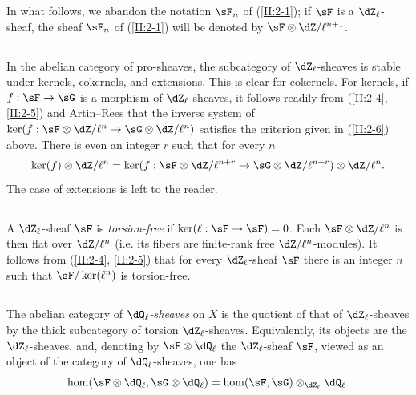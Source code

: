 In what follows, we abandon the notation $\sF_n$ of (\ref{II:2-1}); if
$\sF$ is a $\dZ_\ell$-sheaf, the sheaf $\sF_n$ of (\ref{II:2-1}) will be
denoted by $\sF\otimes\dZ/\ell^{n+1}$.






\subsection{}\label{II:2-7}

In the abelian category of pro-sheaves, the subcategory of
$\dZ_\ell$-sheaves is stable under kernels, cokernels, and extensions. This is
clear for cokernels. For kernels, if $f:\sF\to\sG$ is a morphism of
$\dZ_\ell$-sheaves, it follows readily from
(\ref{II:2-4}, \ref{II:2-5}) and Artin--Rees that the inverse system of
$\ker(f:\sF\otimes\dZ/\ell^n\to\sG\otimes\dZ/\ell^n)$ satisfies the
criterion given in (\ref{II:2-6}) above. There is even an integer $r$ such
that for every $n$
\[
  \ker(f)\otimes\dZ/\ell^n = \ker(f:\sF\otimes\dZ/\ell^{n+r}\to\sG\otimes\dZ/\ell^{n+r})\otimes\dZ/\ell^n \text{.}
\]
The case of extensions is left to the reader.






\subsection{}\label{II:2-8}

A $\dZ_\ell$-sheaf $\sF$ is \emph{torsion-free} if
$\ker(\ell:\sF\to\sF) = 0$. Each $\sF\otimes\dZ/\ell^n$ is then flat over
$\dZ/\ell^n$ (i.e. its fibers are finite-rank free
$\dZ/\ell^n$-modules). It follows from (\ref{II:2-4}, \ref{II:2-5}) that for
every $\dZ_\ell$-sheaf $\sF$ there is an integer $n$ such that
$\sF/\ker(\ell^n)$ is torsion-free.






\subsection{}\label{II:2-9}

The abelian category of \emph{$\dQ_\ell$-sheaves} on $X$ is the quotient of
that of $\dZ_\ell$-sheaves by the thick subcategory of torsion
$\dZ_\ell$-sheaves. Equivalently, its objects are the $\dZ_\ell$-sheaves,
and, denoting by $\sF\otimes\dQ_\ell$ the $\dZ_\ell$-sheaf $\sF$, viewed as
an object of the category of $\dQ_\ell$-sheaves, one has
\[
  \hom(\sF\otimes\dQ_\ell,\sG\otimes\dQ_\ell) = \hom(\sF,\sG)\otimes_{\dZ_\ell}\dQ_\ell \text{.}
\]

